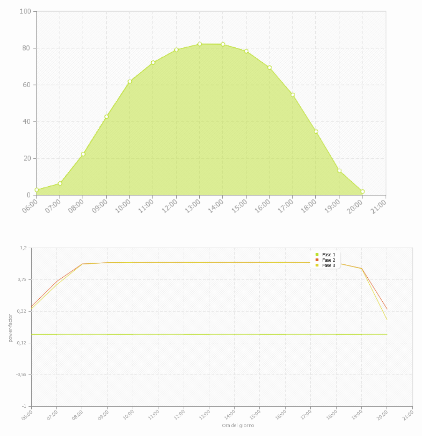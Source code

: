 \begin{figure}[!h]
\centering
\includegraphics[width=400pt]{img/portale/potenza-giornaliera.png}
\end{figure}

\begin{figure}[!h]
\centering
\includegraphics[width=400pt]{img/portale/power-factor-power-transponder.png}
\end{figure}



